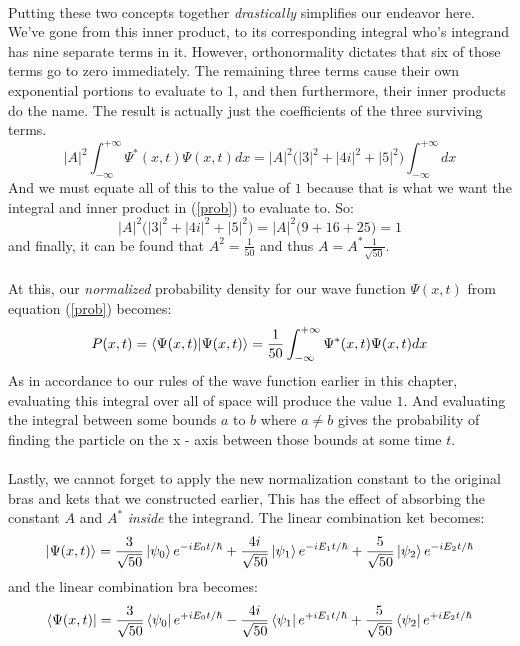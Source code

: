 \documentclass[12pt,letterpaper]{book}
\begin{document}
\paragraph*{}Putting these two concepts together \textit{drastically} simplifies our endeavor here. We've gone from this inner product, to its corresponding integral who's integrand has nine separate terms in it. However, orthonormality dictates that six of those terms go to zero immediately. The remaining three terms cause their own exponential portions to evaluate to 1, and then furthermore, their inner products do the name. The result is actually just the coefficients of the three surviving terms.
\begin{equation}
|A|^2 \int_{-\infty}^{+\infty} \Psi^*(x,t)\Psi(x,t) dx = |A|^2 \Big( |3|^2 + |4i|^2 + |5|^2 \Big) \int_{-\infty}^{+\infty}dx
\end{equation}
And we must equate all of this to the value of $1$ because that is what we want the integral and inner product in (\ref{prob}) to evaluate to. So:
\begin{equation}
|A|^2 \Big( |3|^2 + |4i|^2 + |5|^2 \Big) = |A|^2 \Big(9 + 16 + 25 \Big) = 1
\end{equation}
and finally, it can be found that $A^2 = \frac{1}{50}$ and thus $A = A^* \frac{1}{\sqrt{50}}$.
\paragraph*{}At this, our \textit{normalized} probability density for our wave function $\Psi(x,t)$ from equation (\ref{prob}) becomes:
\begin{equation}
P(x,t) = \braket{\Psi(x,t)}{\Psi(x,t)} = \frac{1}{50}\int_{-\infty}^{+\infty} \Psi^*(x,t)\Psi(x,t) dx
\end{equation}
As in accordance to our rules of the wave function earlier in this chapter, evaluating this integral over all of space will produce the value $1$. And evaluating the integral between some bounds $a$ to $b$ where $a \neq  b$ gives the probability of finding the particle on the x - axis between those bounds at some time $t$.
\paragraph*{}Lastly, we cannot forget to apply the new normalization constant to the original bras and kets that we constructed earlier, This has the effect of absorbing the constant $A$ and $A^*$ \textit{inside} the integrand. The linear combination ket becomes:
\begin{equation}
\label{ex1 norm ket}
\ket{\Psi(x,t)} =  \frac{3}{\sqrt{50}} \ket{\psi_0}e^{-iE_0t/\hbar} + 
\frac{4i}{\sqrt{50}} \ket{\psi_1}e^{-iE_1t/\hbar} + \frac{5}{\sqrt{50}} \ket{\psi_2} e^{-iE_2t/\hbar}
\end{equation}
and the linear combination bra becomes:
\begin{equation}
\label{ex1 norm bra}
\bra{\Psi(x,t)} =  \frac{3}{\sqrt{50}} \bra{\psi_0}e^{+iE_0t/\hbar} - 
\frac{4i}{\sqrt{50}} \bra{\psi_1}e^{+iE_1t/\hbar} + \frac{5}{\sqrt{50}} \bra{\psi_2} e^{+iE_2t/\hbar}
\end{equation}
\end{document}
